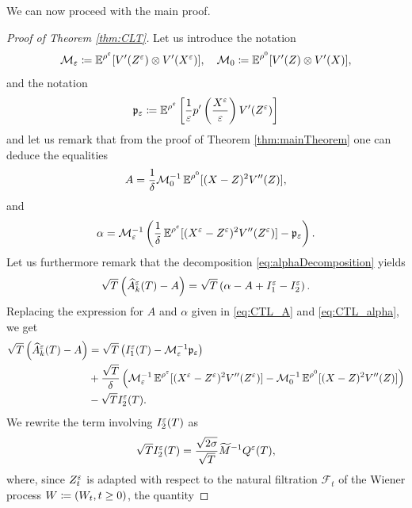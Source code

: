 \documentclass[10pt]{article}
\begin{document}
We can now proceed with the main proof.
\begin{proof}[Proof of Theorem \ref{thm:CLT}] Let us introduce the notation
	\begin{equation}\label{eq:CLT_DefMEps}
	\mathcal M_\varepsilon \coloneqq \operatorname{\mathbb{E}}^{\rho^\varepsilon} [ V'(Z^\varepsilon) \otimes V'(X^\varepsilon) ], \quad \mathcal M_0 \coloneqq \operatorname{\mathbb{E}}^{\rho^0} [ V'(Z) \otimes V'(X) ],
	\end{equation}
	and the notation
	\begin{equation}
	\mathfrak p_\varepsilon \coloneqq \operatorname{\mathbb{E}}^{\rho^\varepsilon} \left [ \frac{1}{\varepsilon} p' \left ( \frac{X^\varepsilon}{\varepsilon} \right ) V'(Z^\varepsilon) \right ]
	\end{equation}
	and let us remark that from the proof of Theorem \ref{thm:mainTheorem} one can deduce the equalities
	\begin{equation}\label{eq:CTL_A}
	A = \frac1\delta \mathcal M_0^{-1} \operatorname{\mathbb{E}}^{\rho^0}[(X - Z)^2 V''(Z)],
	\end{equation}
	and
	\begin{equation}\label{eq:CTL_alpha}
	\alpha = \mathcal M_\varepsilon^{-1} \left(\frac1\delta \operatorname{\mathbb{E}}^{\rho^\varepsilon}[(X^\varepsilon - Z^\varepsilon)^2 V''(Z^\varepsilon)] - \mathfrak p_\varepsilon \right).
	\end{equation}
	Let us furthermore remark that the decomposition \eqref{eq:alphaDecomposition} yields
	\begin{equation}
	\sqrt{T}\left(\widehat A^\varepsilon_k(T) - A\right) = \sqrt{T} \left(\alpha - A + I_1^\varepsilon - I_2^\varepsilon\right).
	\end{equation}
	Replacing the expression for $A$ and $\alpha$ given in \eqref{eq:CTL_A} and \eqref{eq:CTL_alpha}, we get
	\begin{equation}
	\begin{aligned}
	\sqrt{T}\left(\widehat A^\varepsilon_k(T) - A\right) &= \sqrt{T}\left( I_1^\varepsilon(T) - \mathcal M_\varepsilon^{-1} \mathfrak p_\varepsilon \right) \\
	&+  \frac{\sqrt{T}}\delta \left( \mathcal M_\varepsilon^{-1} \operatorname{\mathbb{E}}^{\rho^\varepsilon}[(X^\varepsilon - Z^\varepsilon)^2 V''(Z^\varepsilon)] - \mathcal M_0^{-1} \operatorname{\mathbb{E}}^{\rho^0}[(X - Z)^2 V''(Z)] \right) \\
	&- \sqrt{T} I_2^\varepsilon(T).
	\end{aligned}
	\end{equation}
	 We rewrite the term involving $I_2^\varepsilon(T)$ as
	\begin{equation}
	\sqrt{T} I_2^\varepsilon(T) = \frac{\sqrt{2\sigma}}{\sqrt{T}} \widetilde M^{-1} Q^\varepsilon(T),
	\end{equation}
	where, since $Z_t^\varepsilon$ is adapted with respect to the natural filtration $\mathcal F_t$ of the Wiener process $W \coloneqq \left(W_t, t \geq 0\right)$, the quantity

\end{proof}
\end{document}
